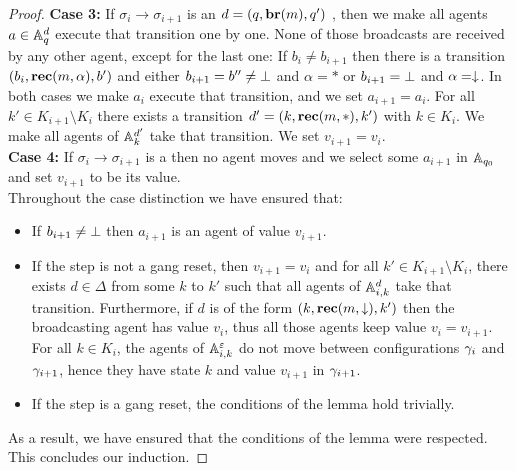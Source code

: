 \begin{proof}
	\textbf{Case 3: } If $\sigma_i \to \sigma_{i+1}$ is an  $d = (q, \textbf{br}(m), q')$ , then we make all agents $a \in \mathbb{A}_q^{d}$ execute that transition one by one. None of those broadcasts are received by any other agent, except for the last one:
	If $b_i \neq b_{i+1}$ then there is a transition $(b_i, \textbf{rec}(m, \alpha), b')$ and either $b_{i+1} = b'' \neq \bot$ and $\alpha = *$ or $b_{i+1} = \bot$ and $\alpha=\downarrow$. In both cases we make $a_i$ execute that transition, and we set $a_{i+1} = a_i$.
	For all $k' \in K_{i+1} \setminus K_i$ there exists a transition $d'=(k, \textbf{rec}(m, *), k')$ with $k \in K_i$. We make all agents of $\mathbb{A}_k^{d'}$ take that transition.
	We set $v_{i+1} = v_i$.
	\\
	
	\textbf{Case 4: }  If $\sigma_i \to \sigma_{i+1}$ is a  then no agent moves and we select some $a_{i+1}$ in $\mathbb{A}_{q_0}$ and set $v_{i+1}$ to be its value.
	\\
	
	Throughout the case distinction we have ensured that:
	\begin{itemize}
		\item If $b_{i+1} \neq \bot$ then $a_{i+1}$ is an agent of value $v_{i+1}$.
		
		\item If the step is not a gang reset, then $v_{i+1} = v_i$ and for all $k' \in K_{i+1} \setminus K_i$, there exists $d \in \Delta$ from some $k$ to $k'$ such that all agents of $\mathbb{A}_{i,k}^d$ take that transition. Furthermore, if $d$ is of the form $(k,\textbf{rec}(m, \downarrow),k')$ then the broadcasting agent has value $v_i$, thus all those agents keep value $v_i = v_{i+1}$. For all $k \in K_{i}$, the agents of $\mathbb{A}_{i,k}^\varepsilon$ do not move between configurations $\gamma_{i}$ and $\gamma_{i+1}$, hence they have state $k$ and value $v_{i+1}$ in $\gamma_{i+1}$.
		
		\item If the step is a gang reset, the conditions of the lemma hold trivially.
	\end{itemize}
	
	As a result, we have ensured that the conditions of the lemma were respected.
	This concludes our induction.
\end{proof}


